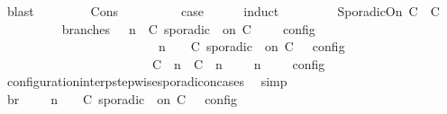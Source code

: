 \begin{isabellebody}
\ blast\isanewline
\ \ \ \ \isamarkupfalse%
\isanewline
{}\isamarkupfalse%
\isanewline
\ \ \isamarkupfalse%
\ {\isacharparenleft}Cons\ {\isasympsi}\ {\isasymPsi}{\isacharparenright}\isanewline
\ \ \ \ \isamarkupfalse%
\ \isamarkupfalse%
\ {\isacharquery}case\isanewline
\ \ \ \ \isamarkupfalse%
\ {\isacharparenleft}induct\ {\isasympsi}{\isacharparenright}\isanewline
\ \ \ \ \ \ \isamarkupfalse%
\ {\isacharparenleft}SporadicOn\ C\ {\isasymtau}\ C\isanewline
\ \ \ \ \ \ \ \ \isamarkupfalse%
\ branches{\isacharcolon}\ {\isacartoucheopen}{\isasymlbrakk}\ {\isasymGamma}{\isacharcomma}\ n\ {\isasymturnstile}\ {\isacharparenleft}{\isacharparenleft}C\ sporadic\ {\isasymtau}\ on\ C\ {\isacharhash}\ {\isasymPsi}{\isacharparenright}\ {\isasymtriangleright}\ {\isasymPhi}\ {\isasymrbrakk}\isactrlsub c\isactrlsub o\isactrlsub n\isactrlsub f\isactrlsub i\isactrlsub g\isanewline
\ \ \ \ \ \ \ \ \ \ \ \ \ \ \ \ \ \ \ \ \ \ {\isacharequal}\ {\isasymlbrakk}\ {\isasymGamma}{\isacharcomma}\ n\ {\isasymturnstile}\ {\isasymPsi}\ {\isasymtriangleright}\ {\isacharparenleft}{\isacharparenleft}C\ sporadic\ {\isasymtau}\ on\ C\ {\isacharhash}\ {\isasymPhi}{\isacharparenright}\ {\isasymrbrakk}\isactrlsub c\isactrlsub o\isactrlsub n\isactrlsub f\isactrlsub i\isactrlsub g\isanewline
\ \ \ \ \ \ \ \ \ \ \ \ \ \ \ \ \ \ \ \ \ \ {\isasymunion}\ {\isasymlbrakk}\ {\isacharparenleft}{\isacharparenleft}C\ {\isasymUp}\ n{\isacharparenright}\ {\isacharhash}\ {\isacharparenleft}C\ {\isasymDown}\ n\ {\isacharat}\ {\isasymtau}{\isacharparenright}\ {\isacharhash}\ {\isasymGamma}{\isacharparenright}{\isacharcomma}\ n\ {\isasymturnstile}\ {\isasymPsi}\ {\isasymtriangleright}\ {\isasymPhi}\ {\isasymrbrakk}\isactrlsub c\isactrlsub o\isactrlsub n\isactrlsub f\isactrlsub i\isactrlsub g{\isacartoucheclose}\isanewline
\ \ \ \ \ \ \ \ \ \ \isamarkupfalse%
\ configuration{\isacharunderscore}interp{\isacharunderscore}stepwise{\isacharunderscore}sporadicon{\isacharunderscore}cases\ \isamarkupfalse%
\ simp\isanewline
\ \ \ \ \ \ \ \ \isamarkupfalse%
\ br{}{\isacharcolon}\ {\isacartoucheopen}{\isasymrho}\ {\isasymin}\ {\isasymlbrakk}\ {\isasymGamma}{\isacharcomma}\ n\ {\isasymturnstile}\ {\isasymPsi}\ {\isasymtriangleright}\ {\isacharparenleft}{\isacharparenleft}C\ sporadic\ {\isasymtau}\ on\ C\ {\isacharhash}\ {\isasymPhi}{\isacharparenright}\ {\isasymrbrakk}\isactrlsub c\isactrlsub o\isactrlsub n\isactrlsub f\isactrlsub i\isactrlsub g\isanewline

\end{isabellebody}
